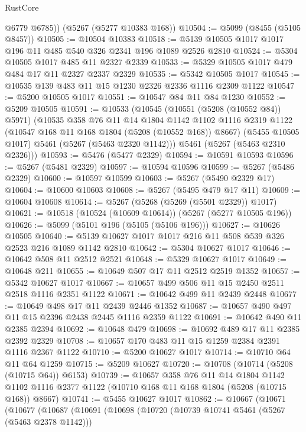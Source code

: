 \begin{lexlean}{RustCore}
\begin{coremodule}
        @6779
        @6785))
    (@5267 (@5277 @10383 @168))
@10504 := @5099 (@8455 (@5105 @8457))
@10505 := @10504 @10383
@10518 := @5139 @10505 @1017 @1017 @196 @11 @485 @540 @326 @2341 @196 @1089 @2526 @2810
@10524 := @5304 @10505 @1017 @485 @11 @2327 @2339
@10533 := @5329 @10505 @1017 @479 @484 @17 @11 @2327 @2337 @2329
@10535 := @5342 @10505 @1017
@10545 := @10535 @139 @483 @11 @15 @1230 @2326 @2336 @1116 @2309 @1122
@10547 := @5200 @10505 @1017
@10551 := @10547 @84 @11 @84 @1230
@10552 := @5209 @10505
@10591 := @10533
    (@10545
      (@10551 (@5208 (@10552 @84)) @5971)
      (@10535
        @358
        @76
        @11
        @14
        @1804
        @1142
        @1102
        @1116
        @2319
        @1122
        (@10547 @168 @11 @168 @1804 (@5208 (@10552 @168)) @8667)
        (@5455 @10505 @1017)
        @5461
        (@5267 (@5463 @2320 @1142)))
      @5461
      (@5267 (@5463 @2310 @2326)))
@10593 := @5476 (@5477 @2329)
@10594 := @10591 @10593
@10596 := @5267 (@5481 @2329)
@10597 := @10594 @10596
@10599 := @5267 (@5486 @2329)
@10600 := @10597 @10599
@10603 := @5267 (@5490 @2329 @17)
@10604 := @10600 @10603
@10608 := @5267 (@5495 @479 @17 @11)
@10609 := @10604 @10608
@10614 := @5267 (@5268 (@5269 (@5501 @2329)) @1017)
@10621 := @10518 (@10524 (@10609 @10614)) (@5267 (@5277 @10505 @196))
@10626 := @5099 (@5101 @196 (@5105 (@5106 @196)))
@10627 := @10626 @10505
@10640 := @5139 @10627 @1017 @1017 @216 @11 @508 @539 @326 @2523 @216 @1089 @1142 @2810
@10642 := @5304 @10627 @1017
@10646 := @10642 @508 @11 @2512 @2521
@10648 := @5329 @10627 @1017
@10649 := @10648 @211
@10655 := @10649 @507 @17 @11 @2512 @2519 @1352
@10657 := @5342 @10627 @1017
@10667 := @10657 @499 @506 @11 @15 @2450 @2511 @2518 @1116 @2351 @1122
@10671 := @10642 @499 @11 @2439 @2448
@10677 := @10649 @498 @17 @11 @2439 @2446 @1352
@10687 := @10657 @490 @497 @11 @15 @2396 @2438 @2445 @1116 @2359 @1122
@10691 := @10642 @490 @11 @2385 @2394
@10692 := @10648 @479
@10698 := @10692 @489 @17 @11 @2385 @2392 @2329
@10708 := @10657 @170 @483 @11 @15 @1259 @2384 @2391 @1116 @2367 @1122
@10710 := @5200 @10627 @1017
@10714 := @10710 @64 @11 @64 @1259
@10715 := @5209 @10627
@10720 := @10708 (@10714 (@5208 (@10715 @64)) @6153)
@10739 := @10657
    @358
    @76
    @11
    @14
    @1804
    @1142
    @1102
    @1116
    @2377
    @1122
    (@10710 @168 @11 @168 @1804 (@5208 (@10715 @168)) @8667)
@10741 := @5455 @10627 @1017
@10862 := @10667
    (@10671
      (@10677
        (@10687
          (@10691
            (@10698
              (@10720
                (@10739 @10741 @5461 (@5267 (@5463 @2378 @1142)))

\end{coremodule}
\end{lexlean}
